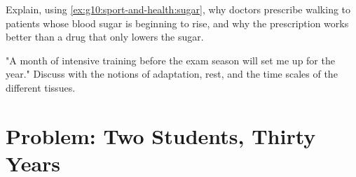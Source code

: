 \begin{exercise}[$\star\star\star$]\label{exo:g10:sport-and-health:14}
Explain, using \cref{ex:g10:sport-and-health:sugar}, why doctors
prescribe walking to patients whose blood sugar is beginning to rise,
and why the prescription works better than a drug that only lowers the
sugar.
\end{exercise}

\begin{exercise}[$\star\star\star$]\label{exo:g10:sport-and-health:15}
"A month of intensive training before the exam season will set me up
for the year." Discuss with the notions of adaptation, rest, and the
time scales of the different tissues.
\end{exercise}

\section{Problem: Two Students, Thirty Years}

